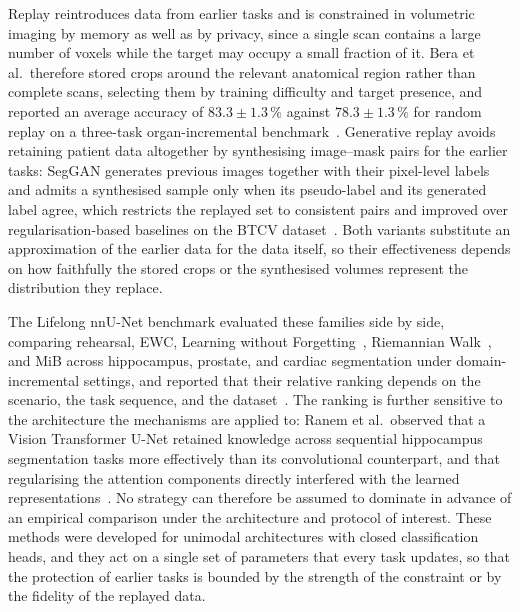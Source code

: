 Replay reintroduces data from earlier tasks and is constrained in volumetric imaging by memory as well as by privacy, since a single scan contains a large number of voxels while the target may occupy a small fraction of it. Bera et al.\ therefore stored crops around the relevant anatomical region rather than complete scans, selecting them by training difficulty and target presence, and reported an average accuracy of $83.3\pm1.3\,\%$ against $78.3\pm1.3\,\%$ for random replay on a three-task organ-incremental benchmark~\cite{memory_replay_cropping}. Generative replay avoids retaining patient data altogether by synthesising image--mask pairs for the earlier tasks: SegGAN generates previous images together with their pixel-level labels and admits a synthesised sample only when its pseudo-label and its generated label agree, which restricts the replayed set to consistent pairs and improved over regularisation-based baselines on the BTCV dataset~\cite{newgenerativereplayapproach}. Both variants substitute an approximation of the earlier data for the data itself, so their effectiveness depends on how faithfully the stored crops or the synthesised volumes represent the distribution they replace.

The Lifelong nnU-Net benchmark evaluated these families side by side, comparing rehearsal, EWC, Learning without Forgetting~\cite{li2017learningforgetting}, Riemannian Walk~\cite{Chaudhry_2018}, and MiB across hippocampus, prostate, and cardiac segmentation under domain-incremental settings, and reported that their relative ranking depends on the scenario, the task sequence, and the dataset~\cite{gonzalez2023lifelong}. The ranking is further sensitive to the architecture the mechanisms are applied to: Ranem et al.\ observed that a Vision Transformer U-Net retained knowledge across sequential hippocampus segmentation tasks more effectively than its convolutional counterpart, and that regularising the attention components directly interfered with the learned representations~\cite{ranem2022continualhippocampussegmentationtransformers}. No strategy can therefore be assumed to dominate in advance of an empirical comparison under the architecture and protocol of interest. These methods were developed for unimodal architectures with closed classification heads, and they act on a single set of parameters that every task updates, so that the protection of earlier tasks is bounded by the strength of the constraint or by the fidelity of the replayed data.

